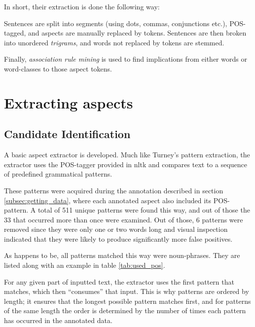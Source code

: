\documentclass[a4paper,11pt]{kth-mag}
\begin{document}
In short, their extraction is done the following way:

Sentences are split into segments (using dots, commas, conjunctions etc.), POS-tagged, and aspects are
manually replaced by tokens. Sentences are then broken into unordered \emph{trigrams},
and words not replaced by tokens are stemmed.

Finally, \emph{association rule mining}\cite{ma1998integrating} is used to find implications
from either words or word-classes to those aspect tokens.

%


\section{Extracting aspects}
\subsection{Candidate Identification}
A basic aspect extractor is developed. Much like Turney's pattern
extraction\cite{turney2002thumbs}, the extractor uses the POS-tagger provided in nltk\cite{nltk} and
compares text to a sequence of predefined grammatical patterns.

These patterns were acquired during the annotation described in section \ref{subsec:getting_data},
where each annotated aspect also included its POS-pattern. A total of 511 unique patterns were found this way,
and out of those the 33 that occurred more than once were examined.
Out of those, 6 patterns were removed since they were only one or two words long and visual inspection
indicated that they were likely to produce significantly more false positives.

As happens to be, all patterns matched this way were noun-phrases. They are listed along with an example in table \ref{tab:used_pos}.

For any given part of inputted text, the extractor uses the first pattern that matches, which then ``consumes'' that input.
This is why patterns are ordered by length; it ensures that the longest possible pattern
matches first, and for patterns of the same length the order is determined by
the number of times each pattern has occurred in the annotated data.
\end{document}
